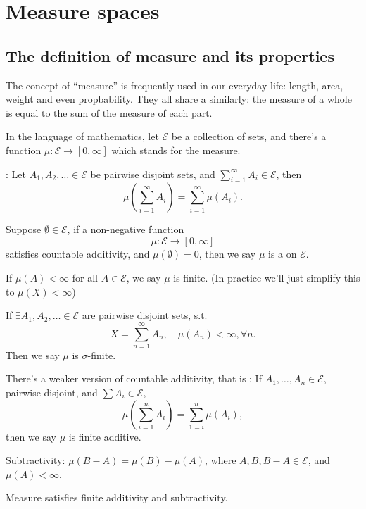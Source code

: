 \section{Measure spaces}
\label{sec:Measure spaces}

\subsection{The definition of measure and its properties}
\label{sub:The definition of measure and its properties}

The concept of ``measure'' is frequently used in our everyday life:
length, area, weight and even propbability.
They all share a similarly: the measure of a whole is equal to the sum of
the measure of each part.

In the language of mathematics, let $\mathscr{E}$ be a collection of sets,
and there's a function $\mu: \mathscr{E}\to [0,\infty]$ which
stands for the measure.

: Let $A_1,A_2,\dots\in \mathscr{E}$ be pairwise disjoint
sets, and $\sum_{i=1}^\infty A_i \in \mathscr{E}$, then
\[
\mu \left( \sum_{i=1}^\infty A_i \right) = \sum_{i=1}^\infty \mu(A_i).
\]

\begin{definition}[Measure]
	Suppose $\emptyset\in \mathscr{E}$, if a non-negative function
	\[
		\mu: \mathscr{E}\to [0,\infty]
	\]
	satisfies countable additivity, and $\mu(\emptyset)=0$, then
	we say  $\mu$ is a  on $\mathscr{E}$.
\end{definition}

If $\mu(A)<\infty$ for all $A\in \mathscr{E}$, we say $\mu$ is finite.
(In practice we'll just simplify this to $\mu(X)<\infty$)

If $\exists A_1,A_2,\dots\in \mathscr{E}$ are pairwise disjoint sets, s.t.
\[
X = \sum_{n=1}^{\infty} A_n, \quad \mu(A_n)<\infty, \forall n.
\]
Then we say $\mu$ is  $\sigma$-finite.

There's a weaker version of countable additivity, that is :
If $A_1,\dots,A_n\in \mathscr{E}$, pairwise disjoint, and $\sum A_i\in \mathscr{E}$,
\[
\mu\left( \sum_{i=1}^{n} A_i \right)=\sum_{1=i}^{n} \mu(A_i),
\]
then we say $\mu$ is finite additive.

Subtractivity: $\mu(B-A)=\mu(B)-\mu(A)$, where  $A,B,B-A\in \mathscr{E}$,
and $\mu(A)<\infty$.

\begin{proposition}
	Measure satisfies finite additivity and subtractivity.
\end{proposition}

